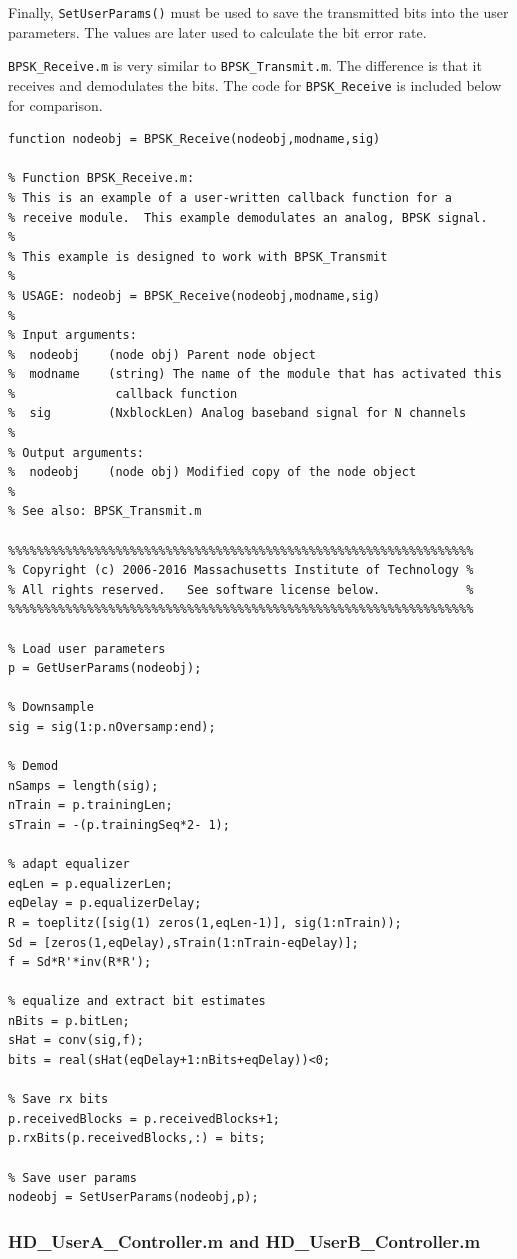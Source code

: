 Finally, \verb+SetUserParams()+ must be used to save the transmitted
bits into the user parameters.  The values are later used to
calculate the bit error rate.

\verb+BPSK_Receive.m+ is very similar to \verb+BPSK_Transmit.m+. The
difference is that it receives and demodulates the bits.  The code
for \verb+BPSK_Receive+ is included below for comparison.

\begin{lstlisting}[name=bpskRx]
function nodeobj = BPSK_Receive(nodeobj,modname,sig)

% Function BPSK_Receive.m:
% This is an example of a user-written callback function for a
% receive module.  This example demodulates an analog, BPSK signal.
%
% This example is designed to work with BPSK_Transmit
%
% USAGE: nodeobj = BPSK_Receive(nodeobj,modname,sig)
%
% Input arguments:
%  nodeobj    (node obj) Parent node object
%  modname    (string) The name of the module that has activated this
%              callback function
%  sig        (NxblockLen) Analog baseband signal for N channels
%
% Output arguments:
%  nodeobj    (node obj) Modified copy of the node object
%
% See also: BPSK_Transmit.m

%%%%%%%%%%%%%%%%%%%%%%%%%%%%%%%%%%%%%%%%%%%%%%%%%%%%%%%%%%%%%%%%%
% Copyright (c) 2006-2016 Massachusetts Institute of Technology %
% All rights reserved.   See software license below.            %
%%%%%%%%%%%%%%%%%%%%%%%%%%%%%%%%%%%%%%%%%%%%%%%%%%%%%%%%%%%%%%%%%

% Load user parameters
p = GetUserParams(nodeobj);

% Downsample
sig = sig(1:p.nOversamp:end);

% Demod
nSamps = length(sig);
nTrain = p.trainingLen;
sTrain = -(p.trainingSeq*2- 1);

% adapt equalizer
eqLen = p.equalizerLen;
eqDelay = p.equalizerDelay;
R = toeplitz([sig(1) zeros(1,eqLen-1)], sig(1:nTrain));
Sd = [zeros(1,eqDelay),sTrain(1:nTrain-eqDelay)];
f = Sd*R'*inv(R*R');

% equalize and extract bit estimates
nBits = p.bitLen;
sHat = conv(sig,f);
bits = real(sHat(eqDelay+1:nBits+eqDelay))<0;

% Save rx bits
p.receivedBlocks = p.receivedBlocks+1;
p.rxBits(p.receivedBlocks,:) = bits;

% Save user params
nodeobj = SetUserParams(nodeobj,p);
\end{lstlisting}

\subsubsection{HD\_UserA\_Controller.m and HD\_UserB\_Controller.m}

